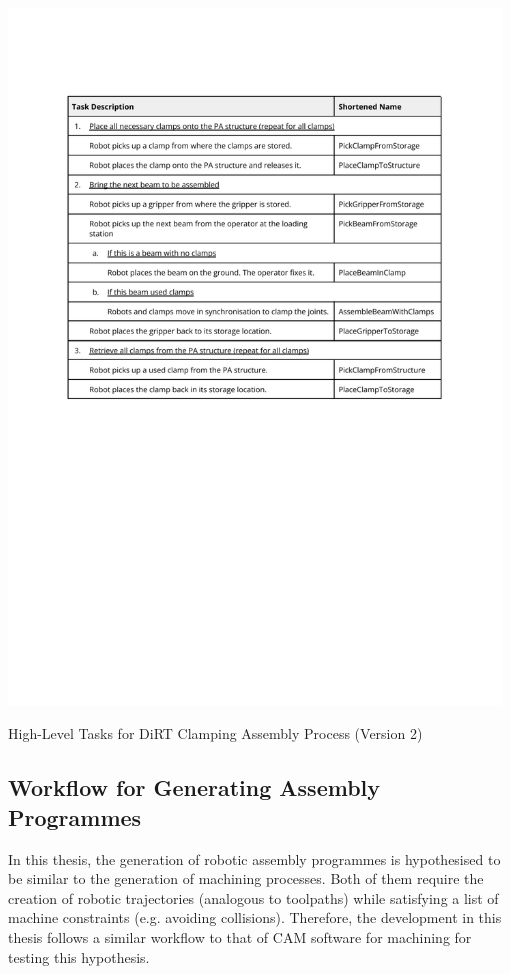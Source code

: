 \begin{table}[!h]
    \includegraphics[page=1, trim=25.4mm 130mm 25.4mm 33mm, clip, width=0.98\textwidth]{tables/Tables in Chapter 6.pdf}
    \caption{High-Level Tasks for DiRT Clamping Assembly Process (Version 2)}
    \label{table:high-level-task-v2}
\end{table}

\FloatBarrier

\subsection{Workflow for Generating Assembly Programmes}
\label{subsection:exploration-3-workflow-for-generating-assembly-programmes}

In this thesis, the generation of robotic assembly programmes is hypothesised to be similar to the generation of machining processes. Both of them require the creation of robotic trajectories (analogous to toolpaths) while satisfying a list of machine constraints (e.g. avoiding collisions). Therefore, the development in this thesis follows a similar workflow to that of CAM software for machining for testing this hypothesis.

